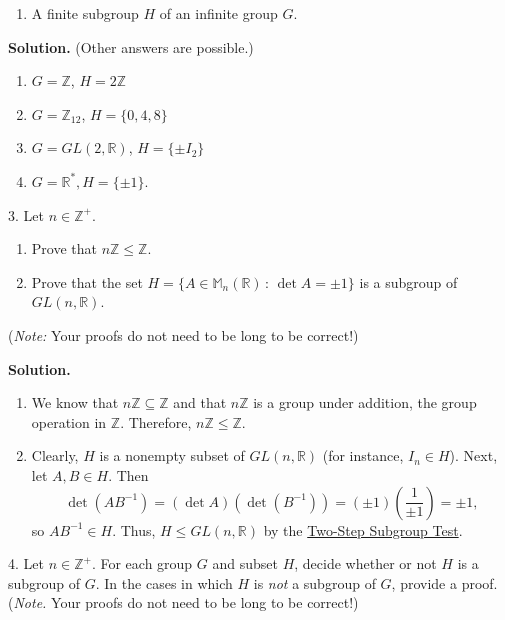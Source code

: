 \documentclass[10pt,]{book}
\theoremstyle{plain}
\theoremstyle{definition}
\theoremstyle{definition}
\theoremstyle{definition}
\theoremstyle{definition}
\numberwithin{equation}{section}
\def\Z{\mathbb{Z}}
\def\R{\mathbb{R}}
\def\M{\mathbb{M}}
\begin{document}
\begin{exerciselist}
\begin{enumerate}[label=(\alph*)]
\item\hypertarget{li-224}{}A finite subgroup \(H\) of an infinite group \(G\).%
\end{enumerate}
%
\par\smallskip
\par\smallskip
\noindent\textbf{Solution.}\hypertarget{solution-29}{}\quad
(Other answers are possible.) \leavevmode%
\begin{enumerate}[label=(\alph*)]
\item\hypertarget{li-225}{}\(G=\Z\), \(H=2\Z\)%
\item\hypertarget{li-226}{}\(G=\Z_{12}\), \(H=\{0,4,8\}\)%
\item\hypertarget{li-227}{}\(G=GL(2,\R)\), \(H=\{\pm I_2\}\)%
\item\hypertarget{li-228}{}\(G=\R^*, H=\{\pm 1\}\).%
\end{enumerate}
%
\item[3.]\hypertarget{exercise-30}{}Let \(n\in \Z^+\). \leavevmode%
\begin{enumerate}[label=(\alph*)]
\item\hypertarget{li-229}{}Prove that \(n\Z \leq \Z\).%
\item\hypertarget{li-230}{}Prove that the set \(H=\{A\in \M_n(\R)\,:\,\det A=\pm 1\}\) is a subgroup of \(GL(n,\R)\).%
\end{enumerate}
%
\par
(\emph{Note:} Your proofs do not need to be long to be correct!)%
\par\smallskip
\par\smallskip
\noindent\textbf{Solution.}\hypertarget{solution-30}{}\quad
\leavevmode%
\begin{enumerate}[label=(\alph*)]
\item\hypertarget{li-231}{}We know that \(n\Z\subseteq \Z\) and that \(n\Z\) is a group under addition, the group operation in \(\Z\).  Therefore, \(n\Z\leq \Z\).%
\item\hypertarget{li-232}{}Clearly, \(H\) is a nonempty subset of \(GL(n,\R)\) (for instance, \(I_n\in H\)).  Next, let \(A,B\in H\). Then%
\begin{equation*}
\det(AB^{-1})=(\det A)(\det (B^{-1}))=(\pm 1)\left(\frac{1}{\pm 1}\right)=\pm 1,
\end{equation*}
so \(AB^{-1}\in H\).  Thus, \(H\leq GL(n,\R)\) by the \hyperref[twostep]{Two-Step Subgroup Test}.%
\end{enumerate}
%
\item[4.]\hypertarget{exercise-31}{}Let \(n\in \Z^+\). For each group \(G\) and subset \(H\), decide whether or not \(H\) is a subgroup of \(G\). In the cases in which \(H\) is \emph{not} a subgroup of \(G\), provide a proof. (\emph{Note.} Your proofs do not need to be long to be correct!) \leavevmode%

\end{exerciselist}
\end{document}
